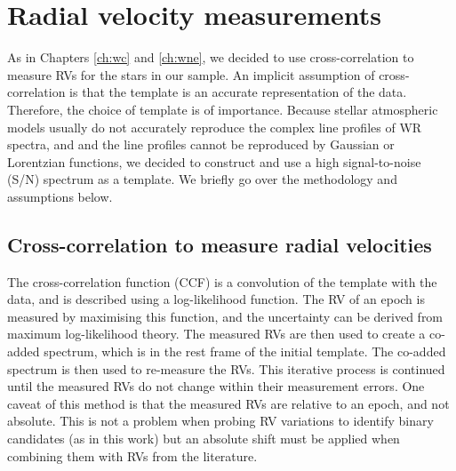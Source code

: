 \section{Radial velocity measurements} \label{sect:rv_WNL}

As in Chapters \ref{ch:wc} and \ref{ch:wne}, we decided to use cross-correlation to measure RVs for the stars in our sample. An implicit assumption of cross-correlation is that the template is an accurate representation of the data. Therefore, the choice of template is of importance. Because stellar atmospheric models usually do not accurately reproduce the complex line profiles of WR spectra, and and the line profiles cannot be reproduced by Gaussian or Lorentzian functions, we decided to construct and use a high signal-to-noise (S/N) spectrum as a template. We briefly go over the methodology and assumptions below.

\subsection{Cross-correlation to measure radial velocities}

The cross-correlation function (CCF) is a convolution of the template with the data, and is described using a log-likelihood function. The RV of an epoch is measured by maximising this function, and the uncertainty can be derived from maximum log-likelihood theory. The measured RVs are then used to create a co-added spectrum, which is in the rest frame of the initial template. The co-added spectrum is then used to re-measure the RVs. This iterative process is continued until the measured RVs do not change within their measurement errors. One caveat of this method is that the measured RVs are relative to an epoch, and not absolute. This is not a problem when probing RV variations to identify binary candidates (as in this work) but an absolute shift must be applied when combining them with RVs from the literature. 


